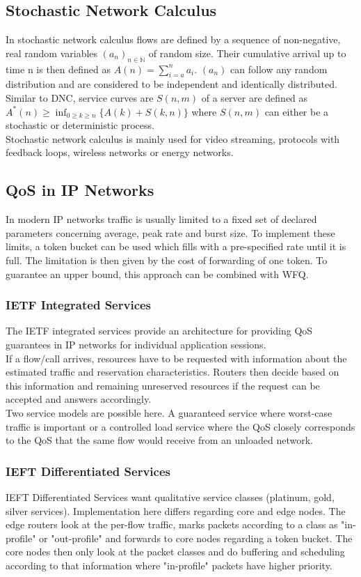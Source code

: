\subsection{Stochastic Network Calculus}
In stochastic network calculus flows are defined by a sequence of non-negative, real random variables $(a_n)_{n \in \mathds{N}}$ of random size.
Their cumulative arrival up to time n is then defined as $A(n) = \sum^n_{i=a}a_i$.
$(a_n)$ can follow any random distribution and are considered to be independent and identically distributed.
Similar to DNC, service curves are $S(n,m)$ of a server are defined as $A^*(n) \geq \inf_{0 \geq k \geq n} \{A(k) + S(k,n)\}$ where $S(n,m)$ can either be a stochastic or deterministic process.\\

Stochastic network calculus is mainly used for video streaming, protocols with feedback loops, wireless networks or energy networks.

\subsection{QoS in IP Networks}
In modern IP networks traffic is usually limited to a fixed set of declared parameters concerning average, peak rate and burst size.
To implement these limits, a token bucket can be used which fills with a pre-specified rate until it is full.
The limitation is then given by the cost of forwarding of one token.
To guarantee an upper bound, this approach can be combined with WFQ.

\subsubsection*{IETF Integrated Services}
The IETF integrated services provide an architecture for providing QoS guarantees in IP networks for individual application sessions.\\
If a flow/call arrives, resources have to be requested with information about the estimated traffic and reservation characteristics.
Routers then decide based on this information and remaining unreserved resources if the request can be accepted and answers accordingly.\\
Two service models are possible here.
A guaranteed service where worst-case traffic is important or a controlled load service where the QoS closely corresponds to the QoS that the same flow would receive from an unloaded network.

\subsubsection*{IEFT Differentiated Services}
IEFT Differentiated Services want qualitative service classes (platinum, gold, silver services).
Implementation here differs regarding core and edge nodes.
The edge routers look at the per-flow traffic, marks packets according to a class as "in-profile" or "out-profile" and forwards to core nodes regarding a token bucket.
The core nodes then only look at the packet classes and do buffering and scheduling according to that information where "in-profile" packets have higher priority.

